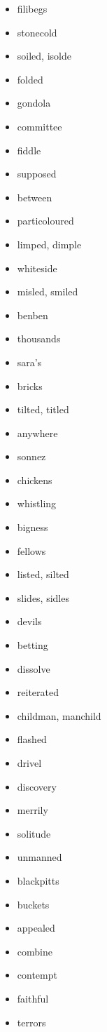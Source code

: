 \documentclass{article}
\begin{document}
\begin{itemize}
    \item filibegs
    \item stonecold
    \item soiled, isolde
    \item folded
    \item gondola
    \item committee
    \item fiddle
    \item supposed
    \item between
    \item particoloured
    \item limped, dimple
    \item whiteside
    \item misled, smiled
    \item benben
    \item thousands
    \item sara's
    \item bricks
    \item tilted, titled
    \item anywhere
    \item sonnez
    \item chickens
    \item whistling
    \item bigness
    \item fellows
    \item listed, silted
    \item slides, sidles
    \item devils
    \item betting
    \item dissolve
    \item reiterated
    \item childman, manchild
    \item flashed
    \item drivel
    \item discovery
    \item merrily
    \item solitude
    \item unmanned
    \item blackpitts
    \item buckets
    \item appealed
    \item combine
    \item contempt
    \item faithful
    \item terrors

\end{itemize}
\end{document}
